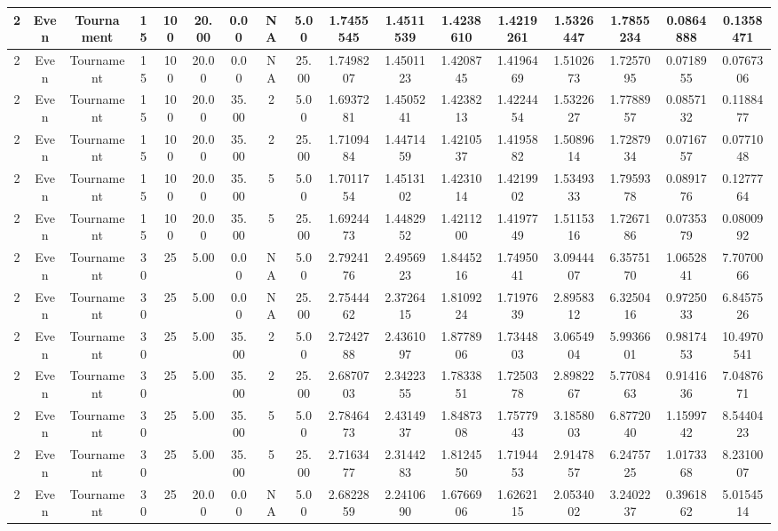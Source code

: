 \documentclass[a4paper]{article}
\begin{document}
\begin{center}
\begin{tabular}{ | c | c | c | c | c | c | c | c | c | c | c | c | c | c | c | c | c | }
		\hline
		2	&	Even	&	Tournament	&	15	&	100	&	20.00	&	0.00	&	NA	&	5.00	&	1.7455545	&	1.4511539	&	1.4238610	&	1.4219261	&	1.5326447	&	1.7855234	&	0.0864888	&	0.1358471 \\
		\hline
		2	&	Even	&	Tournament	&	15	&	100	&	20.00	&	0.00	&	NA	&	25.00	&	1.7498207	&	1.4501123	&	1.4208745	&	1.4196469	&	1.5102673	&	1.7257095	&	0.0718955	&	0.0767306 \\
		\hline
		2	&	Even	&	Tournament	&	15	&	100	&	20.00	&	35.00	&	2	&	5.00	&	1.6937281	&	1.4505241	&	1.4238213	&	1.4224454	&	1.5322627	&	1.7788957	&	0.0857132	&	0.1188477 \\
		\hline
		2	&	Even	&	Tournament	&	15	&	100	&	20.00	&	35.00	&	2	&	25.00	&	1.7109484	&	1.4471459	&	1.4210537	&	1.4195882	&	1.5089614	&	1.7287934	&	0.0716757	&	0.0771048 \\
		\hline
		2	&	Even	&	Tournament	&	15	&	100	&	20.00	&	35.00	&	5	&	5.00	&	1.7011754	&	1.4513102	&	1.4231014	&	1.4219902	&	1.5349333	&	1.7959378	&	0.0891776	&	0.1277764 \\
		\hline
		2	&	Even	&	Tournament	&	15	&	100	&	20.00	&	35.00	&	5	&	25.00	&	1.6924473	&	1.4482952	&	1.4211200	&	1.4197749	&	1.5115316	&	1.7267186	&	0.0735379	&	0.0800992 \\
		\hline
		2	&	Even	&	Tournament	&	30	&	25	&	5.00	&	0.00	&	NA	&	5.00	&	2.7924176	&	2.4956923	&	1.8445216	&	1.7495041	&	3.0944407	&	6.3575170	&	1.0652841	&	7.7070066 \\
		\hline
		2	&	Even	&	Tournament	&	30	&	25	&	5.00	&	0.00	&	NA	&	25.00	&	2.7544462	&	2.3726415	&	1.8109224	&	1.7197639	&	2.8958312	&	6.3250416	&	0.9725033	&	6.8457526 \\
		\hline
		2	&	Even	&	Tournament	&	30	&	25	&	5.00	&	35.00	&	2	&	5.00	&	2.7242788	&	2.4361097	&	1.8778906	&	1.7344803	&	3.0654904	&	5.9936601	&	0.9817453	&	10.4970541 \\
		\hline
		2	&	Even	&	Tournament	&	30	&	25	&	5.00	&	35.00	&	2	&	25.00	&	2.6870703	&	2.3422355	&	1.7833851	&	1.7250378	&	2.8982267	&	5.7708463	&	0.9141636	&	7.0487671 \\
		\hline
		2	&	Even	&	Tournament	&	30	&	25	&	5.00	&	35.00	&	5	&	5.00	&	2.7846473	&	2.4314937	&	1.8487308	&	1.7577943	&	3.1858003	&	6.8772040	&	1.1599742	&	8.5440423 \\
		\hline
		2	&	Even	&	Tournament	&	30	&	25	&	5.00	&	35.00	&	5	&	25.00	&	2.7163477	&	2.3144283	&	1.8124550	&	1.7194453	&	2.9147857	&	6.2475725	&	1.0173368	&	8.2310007 \\
		\hline
		2	&	Even	&	Tournament	&	30	&	25	&	20.00	&	0.00	&	NA	&	5.00	&	2.6822859	&	2.2410690	&	1.6766906	&	1.6262115	&	2.0534002	&	3.2402237	&	0.3961862	&	5.0154514 \\

\end{tabular}
\end{center}
\end{document}
